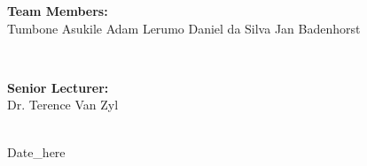 \documentclass[a4paper]{article}
\begin{document}
\begin{titlepage}
\begin{minipage}{0.4\textwidth}
\begin{flushleft}
\textbf{Team Members:} \\[0.3cm]

Tumbone Asukile\newline
Adam Lerumo\newline
Daniel da Silva\newline
Jan Badenhorst\newline

\end{flushleft}

\end{minipage} \\[0.7cm]

\begin{minipage}{0.4\textwidth}

\begin{flushright} \large

\textbf{Senior Lecturer:} \\[0.3cm]

Dr. Terence Van Zyl

\end{flushright}

\end{minipage} \\[1cm]

{\large Date\_here} 
    
\end{titlepage}

\setlength\parindent{24pt}

\newpage
\end{document}
